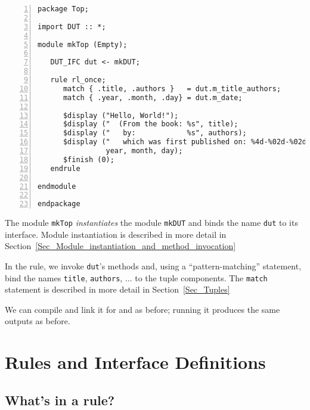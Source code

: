 {\footnotesize
\begin{Verbatim}[frame=single, numbers=left, label=in file Ex\_04\_04/Top.bsv]
package Top;

import DUT :: *;

module mkTop (Empty);

   DUT_IFC dut <- mkDUT;

   rule rl_once;
      match { .title, .authors }   = dut.m_title_authors;
      match { .year, .month, .day} = dut.m_date;

      $display ("Hello, World!");
      $display ("  (From the book: %s", title);
      $display ("   by:            %s", authors);
      $display ("   which was first published on: %4d-%02d-%02d)",
                year, month, day);
      $finish (0);
   endrule

endmodule

endpackage
\end{Verbatim}
}

The module \verb|mkTop| \emph{instantiates} the module \verb|mkDUT|
and binds the name \verb|dut| to its interface.  Module instantiation
is described in more detail in
Section~\ref{Sec_Module_instantiation_and_method_invocation}

In the rule, we invoke \verb|dut|'s methods and, using a
``pattern-matching'' statement, bind the names \verb|title|,
\verb|authors|, ... {\etc} to the tuple components. The \verb|match|
statement is described in more detail in Section~\ref{Sec_Tuples}

We can compile and link it for {\BLUESIM} and {\Verilator} as before;
running it produces the same outputs as before.




\section{Rules and Interface Definitions}

\label{Sec_Rules_and_Interface_Defs}


\subsection{What's in a rule?}

